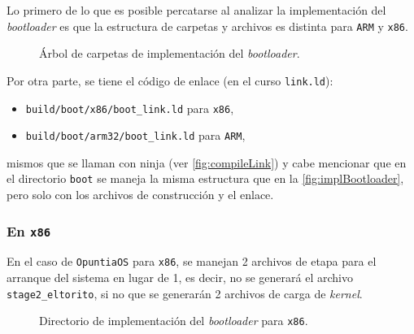	

	Lo primero de lo que es posible percatarse al analizar la implementación del \textit{bootloader} es que la estructura de carpetas y archivos es distinta para \texttt{ARM} y \texttt{x86}.
	\begin{figure}[ht]
		\centering
		\hspace*{0.3cm}
		\caption{
			Árbol de carpetas de implementación del \textit{bootloader}.
			\label{fig:implBootloader}
		}
	\end{figure}

	
	
	Por otra parte, se tiene el código de enlace (en el curso \texttt{link.ld}):
	\begin{itemize} \setlength\itemsep{0pt}
		\item \texttt{build/boot/x86/boot\_link.ld} para \texttt{x86},
		\item \texttt{build/boot/arm32/boot\_link.ld} para \texttt{ARM},
	\end{itemize}
	
	mismos que se llaman con ninja (ver \autoref{fig:compileLink}) y cabe mencionar que en el directorio \texttt{boot} se maneja la misma estructura que en la \autoref{fig:implBootloader}, pero solo con los archivos de construcción y el enlace.
	
	
	
	\subsubsection{En \texttt{x86}}
	En el caso de \texttt{OpuntiaOS} para \texttt{x86}, se manejan 2 archivos de etapa para el arranque del sistema en lugar de 1, es decir, no se generará el archivo \texttt{stage2\_eltorito}, si no que se generarán 2 archivos de carga de \textit{kernel}.
	\begin{figure}[ht]
		\centering
		\hspace*{1cm}
		\caption{
			Directorio de implementación del \textit{bootloader} para \texttt{x86}.
			\label{fig:x86Boot}
		}
	\end{figure}
	
